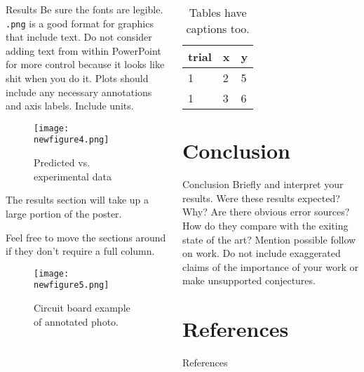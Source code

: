 \documentclass[pdf]{beamer}
\begin{document}
\begin{frame}[fragile]
\begin{columns}
\begin{column}{0.25\textwidth}
\begin{minipage}[t][\textheight]{\linewidth}
\begin{block}{Results}
Be sure the fonts are legible.  \lstinline{.png} is a good format for graphics that include text. Do not consider adding text from within PowerPoint for more control because it looks like shit when you do it.  Plots should include any necessary annotations and axis labels. Include units.
\begin{figure}
\texttt{[image: newfigure4.png]}
\caption{Predicted vs. experimental data}
\end{figure} 

The results section will take up a large portion of the poster.  
\end{block}
\vfill

\begin{block}{}
Feel free to move the sections around if they don’t require a full column. 
\begin{figure}
\texttt{[image: newfigure5.png]}
\caption{Circuit board example of annotated photo.}
\end{figure}
\end{block}
\end{minipage}
\end{column}

\begin{column}{0.25\textwidth}
\begin{minipage}[t][\textheight]{\linewidth}
\begin{table}
\caption{Tables have captions too.}
\begin{tabular}{lll}
\toprule
trial & x & y \\
\midrule
1 & 2 & 5 \\
1 & 3 & 6 \\
\bottomrule
\end{tabular}
\end{table}
\vfill

\section{Conclusion}
\begin{block}{Conclusion}\small
Briefly and interpret your results. Were these results expected? Why? Are there obvious error sources? How do they compare with the exiting state of the art?   Mention possible follow on work.   Do not include exaggerated claims of the importance of your work or make unsupported conjectures. 
\end{block}
\vfill

\section*{References}
\begin{block}{References}
\nocite{bingulac1994on, vidmar2018on}

\scriptsize
\end{block}
\vfill


\end{minipage}
\end{column}
\end{columns}
\end{frame}
\end{document}
